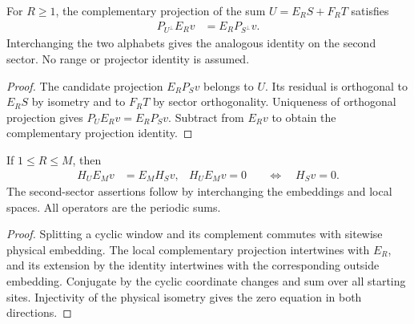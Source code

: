 \begin{lemma}
    \label{lem:physical_sector_parent_projection_transport}
    \leanok
    For $R\ge1$, the complementary projection of the sum
    $U=E_R S+F_R T$ satisfies
    \begin{align}
        P_{U^{\perp}}E_R v & =E_R P_{S^{\perp}}v.
    \end{align}
    Interchanging the two alphabets gives the analogous identity on the
    second sector. No range or projector identity is assumed.
\end{lemma}
\begin{proof}
    \leanok
    The candidate projection $E_R P_Sv$ belongs to $U$. Its residual is
    orthogonal to $E_R S$ by isometry and to $F_R T$ by sector orthogonality.
    Uniqueness of orthogonal projection gives $P_U E_Rv=E_RP_Sv$.
    Subtract from $E_Rv$ to obtain the complementary projection identity.
\end{proof}

\begin{lemma}
    \label{lem:physical_sector_periodic_hamiltonian_transport}
    \leanok
    If $1\le R\le M$, then
    \begin{align}
        H_U E_Mv  & =E_MH_Sv,                             &
        H_UE_Mv=0 & \quad\Longleftrightarrow\quad H_Sv=0.
    \end{align}
    The second-sector assertions follow by interchanging the embeddings
    and local spaces. All operators are the periodic sums.
\end{lemma}
\begin{proof}
    \leanok
    Splitting a cyclic window and its complement commutes with sitewise
    physical embedding. The local complementary projection intertwines
    with $E_R$, and its extension by the identity intertwines with the
    corresponding outside embedding. Conjugate by the cyclic coordinate
    changes and sum over all starting sites. Injectivity of the physical
    isometry gives the zero equation in both directions.
\end{proof}


